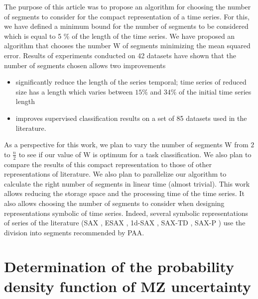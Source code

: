 The purpose of this article was to propose an algorithm for choosing the number of segments to consider for the compact representation of a time series. For this, we have defined a minimum bound for the number of segments to be considered which is equal to 5 \% of the length of the time series. We have proposed an algorithm that chooses the number W of segments minimizing the mean squared error. Results of experiments conducted on 42 datasets
 have shown that the number of segments chosen allows two improvements
 \begin{itemize}
\item significantly reduce the length of the series
temporal; time series of reduced size has a length
which varies between $ 15 \% $ and $ 34 \% $ of the initial time series length
\item improves supervised classification results on a set of 85 datasets
used in the literature. 
\end{itemize}
As a perspective for this work, we plan to vary the number of
segments W from $ 2 $ to $ \frac{n}{2} $ to see if our value of W is optimum for a task classification. We also plan to compare the results of this compact representation to
those of other representations of literature. We also plan to parallelize our algorithm to calculate the right number of segments in linear time (almost trivial). This work allows
reducing the storage space and the processing time of the time series. It also allows choosing the number of segments to consider when designing representations
symbolic of time series. Indeed, several symbolic representations of series
of the literature (SAX \cite{lin2003symbolic}, ESAX \cite{lkhagva2006extended}, 1d-SAX \cite{Malinowski2013},
SAX-TD \cite{sun2014improvement}, SAX-P \cite{siyou2015}) use the division into segments recommended by PAA.
\label{conclusion}



















\chapter{Determination of the probability density function of MZ  uncertainty}
\label{pdf_uncertainty}


